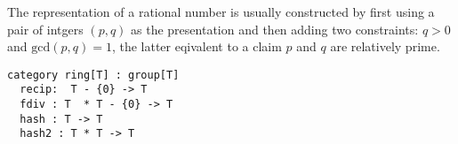 \begin{example}
The representation of a rational number is usually constructed by first using
a pair of intgers $(p,q)$ as the presentation and then adding two constraints:
$q>0$ and $\mathrm{gcd}(p,q)=1$, the latter eqivalent to a claim $p$ and $q$ are relatively
prime.
\end{example}


\begin{verbatim}
category ring[T] : group[T]
  recip:  T - {0} -> T
  fdiv : T  * T - {0} -> T
  hash : T -> T
  hash2 : T * T -> T
\end{verbatim}


